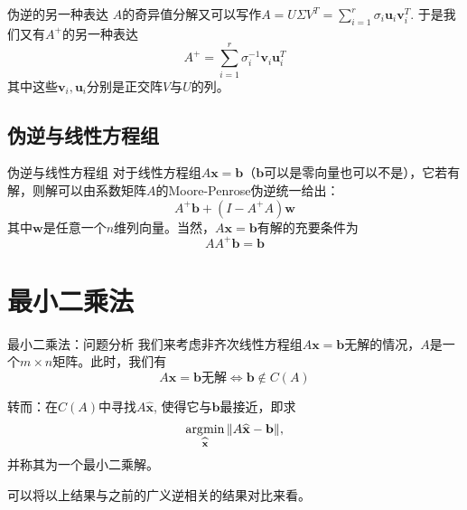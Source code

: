 
\begin{frame}

\begin{block}{伪逆的另一种表达}
$A$的奇异值分解又可以写作\(\displaystyle A = U\Sigma V^T = \sum\limits_{i=1}^r \sigma_i \mathbf{u}_i \mathbf{v}_i^T \). 于是我们又有$A^+$的另一种表达
$$A^+ = \sum\limits_{i=1}^r \sigma_i^{-1} \mathbf{v}_i \mathbf{u}_i^T$$
其中这些$\mathbf{v}_i, \mathbf{u}_i$分别是正交阵$V$与$U$的列。
\end{block}

\end{frame}


\subsection{伪逆与线性方程组}


\begin{frame}

\begin{block}{伪逆与线性方程组}
对于线性方程组$A\mathbf{x} = \mathbf{b}$（$\mathbf{b}$可以是零向量也可以不是），它若有解，则解可以由系数矩阵$A$的Moore-Penrose伪逆统一给出：
$$A^+\mathbf{b} + (I - A^+A)\mathbf{w}$$
其中$\mathbf{w}$是任意一个$n$维列向量。当然，$A\mathbf{x} = \mathbf{b}$有解的充要条件为
$$AA^+\mathbf{b} = \mathbf{b}$$
\end{block}

\end{frame}


\section{最小二乘法}


\begin{frame}

\begin{block}{最小二乘法：问题分析}
我们来考虑非齐次线性方程组$A\mathbf{x} = \mathbf{b}$无解的情况，$A$是一个$m\times n$矩阵。此时，我们有
$$A\mathbf{x} = \mathbf{b}\text{无解} \Longleftrightarrow \mathbf{b}\not\in C(A)$$

转而：在$C(A)$中寻找$A\widehat{\mathbf{x}}$, 使得它与$\mathbf{b}$最接近，即求
$$\operatorname*{\arg\!\min}_{\widehat{\mathbf{x}}}\Vert A\widehat{\mathbf{x}} - \mathbf{b} \Vert,$$
并称其为一个最小二乘解。

\vspace{2em}
可以将以上结果与之前的广义逆相关的结果对比来看。
\end{block}

\end{frame}

